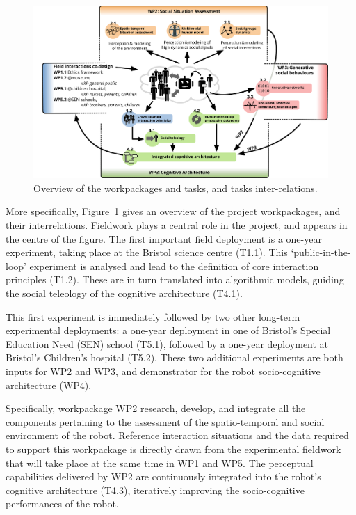 \documentclass[11pt,a4paper]{report}
\begin{document}
\begin{figure}[h!]
\centering
\includegraphics[width=\linewidth]{figs/wps}
\caption{Overview of the workpackages and tasks, and tasks inter-relations.}
\label{fig:wps}
\end{figure}

More specifically, Figure~\ref{fig:wps} gives an overview of the project
workpackages, and their interrelations. Fieldwork plays a central role in the
project, and appears in the centre of the figure. The first important field
deployment is a one-year experiment, taking place at the Bristol science centre
(T1.1). This `public-in-the-loop' experiment is analysed and lead to the
definition of core interaction principles (T1.2). These are in turn translated
into algorithmic models, guiding the social teleology of the cognitive
architecture (T4.1).

This first experiment is immediately followed by two other long-term
experimental deployments: a one-year deployment in one of Bristol's Special
Education Need (SEN) school (T5.1), followed by a one-year deployment at
Bristol's Children's hospital (T5.2). These two additional experiments are both
inputs for WP2 and WP3, and demonstrator for the robot socio-cognitive
architecture (WP4).

Specifically, workpackage WP2 research, develop, and integrate all the components
pertaining to the assessment of the spatio-temporal and social environment of
the robot. Reference interaction situations and the data required to support
this workpackage is directly drawn from the experimental fieldwork that will
take place at the same time in WP1 and WP5. The perceptual capabilities
delivered by WP2 are continuously integrated into the robot's cognitive
architecture (T4.3), iteratively improving the socio-cognitive performances of
the robot.
\end{document}
